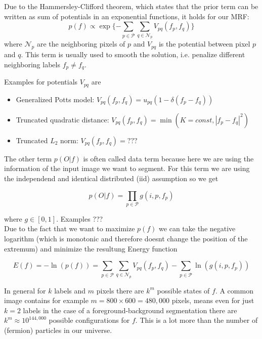 \documentclass{scrartcl}[12pt, halfparskip]
\begin{document}
Due to the Hammersley-Clifford theorem, which states that the prior term can be written as sum of potentials in an exponential functions, it holds for our MRF:
\begin{equation}
	p(f) \propto \exp\{ - \sum\limits_{p \in \mathcal{P}} \sum\limits_{q \in \mathcal{N}_p} V_{pq} (f_p, f_q) \}
\end{equation}
where $\mathcal{N}_p$ are the neighboring pixels of $p$ and $V_{pq}$ is the potential between pixel $p$ and $q$. This term is usually used to smooth the solution, i.e. penalize different neighboring labels $f_p \neq f_q$.

Examples for potentials $V_{pq}$ are
\begin{itemize}
	\item Generalized Potts model: $V_{pq}(f_p, f_q) = u_{pq} (1 - \delta(f_p - f_q))$
	\item Truncated quadratic distance: $V_{pq}(f_p, f_q) = \min (K=const, |f_p - f_q|^2)$
	\item Truncated $L_2$ norm: $V_{pq}(f_p, f_q) = ???$
\end{itemize}

The other term $p(O|f)$ is often called data term because here we are using the information of the input image we want to segment. For this term we are using the independend and identical distributed (iid) assumption so we get

\begin{equation}
	p(O|f) = \prod\limits_{p \in \mathcal{P}} g(i, p, f_p)
\end{equation}

where $g \in [0, 1]$. Examples ??? \\

Due to the fact that we want to maximize $p(f)$ we can take the negative logarithm (which is monotonic and therefore doesnt change the position of the extremum) and minimize the resultung Energy function

\begin{equation}
E(f) = - \ln(p(f)) = \sum\limits_{p \in \mathcal{P}} \sum\limits_{q \in \mathcal{N}_p} V_{pq} (f_p, f_q) - \sum\limits_{p \in \mathcal{P}} \ln(g(i, p, f_p))
\end{equation}

In general for $k$ labels and $m$ pixels there are $k^m$ possible states of $f$. A common image contains for example $m = 800 \times 600 = 480,000$ pixels, means even for just $k = 2$ labels in the case of a foreground-background segmentation there are $k^m \approx 10^{144,000}$ possible configurations for $f$. This is a lot more than the number of (fermion) particles in our universe.
\end{document}
